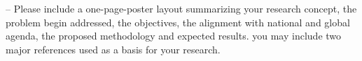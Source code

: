 -- Please include a one-page-poster layout summarizing your research concept, the problem begin addressed, the objectives, the alignment with national and global agenda, the proposed methodology and expected results. you may include two major references used as a basis for your research.  